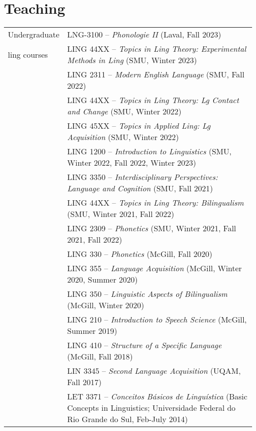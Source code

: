 \documentclass[letterpaper,10pt]{article}
\begin{document}
 \vspace{0.3cm}

 
 
 
 \section{Teaching}

\begin{tabular}{p{2.7cm}p{14.2cm}}

Undergraduate & LNG-3100 -- \emph{Phonologie II} (Laval, Fall 2023)\\
ling courses		& LING 44XX -- \emph{Topics in Ling Theory: Experimental Methods in Ling} (SMU, Winter 2023)\\				

 & LING 2311 -- \emph{Modern English Language} (SMU, Fall 2022) \\
			& LING 44XX -- \emph{Topics in Ling Theory: Lg Contact and Change} (SMU, Winter 2022)\\
			& LING 45XX -- \emph{Topics in Applied Ling: Lg Acquisition} (SMU, Winter 2022) \\
				& LING 1200 -- \emph{Introduction to Linguistics} (SMU, Winter 2022, Fall 2022, Winter 2023)\\
				& LING 3350 -- \emph{Interdisciplinary Perspectives: Language and Cognition} (SMU, Fall 2021) \\
				& LING 44XX -- \emph{Topics in Ling Theory: Bilingualism} (SMU, Winter 2021, Fall 2022)	\\
			& LING 2309 -- \emph{Phonetics} (SMU, Winter 2021, Fall 2021, Fall 2022)	\\
				& LING 330 -- \emph{Phonetics} (McGill, Fall 2020)\\	
				& LING 355 -- \emph{Language Acquisition} (McGill, Winter 2020, Summer 2020) \\
						& LING 350 -- \emph{Linguistic Aspects of Bilingualism} (McGill, Winter 2020) \\
						& LING 210 -- \emph{Introduction to Speech Science} (McGill, Summer 2019) \\
						& LING 410 -- \emph{Structure of a Specific Language} (McGill, Fall 2018) \\
						& LIN 3345 -- \emph{Second Language Acquisition} (UQAM, Fall 2017) \\
						& LET 3371 -- \emph{Conceitos B\'asicos de Lingu\'i­stica} (Basic Concepts in Linguistics; Universidade Federal do Rio Grande do Sul, Feb-July 2014)\\

\end{tabular}
\end{document}
